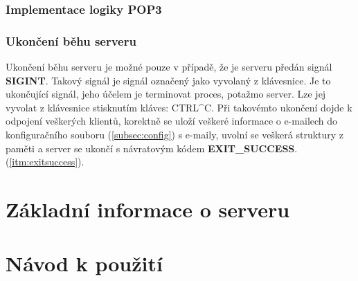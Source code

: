 \documentclass[11pt,a4paper]{report}
\begin{document}
    \subsubsection{Implementace logiky POP3}
    \label{subsec:pop3implementation}
    \subsubsection{Ukončení běhu serveru}
    \label{subsec:sigint}
    Ukončení běhu serveru je možné pouze v případě, že je serveru předán signál \textbf{SIGINT}. Takový signál je signál označený jako vyvolaný z klávesnice. Je to ukončující signál, jeho účelem je terminovat proces, potažmo server. Lze jej vyvolat z klávesnice stisknutím kláves: CTRL\^{}C. Při takovémto ukončení dojde k odpojení veškerých klientů, korektně se uloží veškeré informace o e-mailech do konfiguračního souboru  (\ref{subsec:config}) s e-maily, uvolní se veškerá struktury z paměti a server se ukončí s návratovým kódem \textbf{EXIT\_SUCCESS}. (\ref{itm:exitsuccess}).

    \clearpage
    \section{Základní informace o serveru}


    \clearpage
    \section{Návod k použití}
    
    
\end{document}
